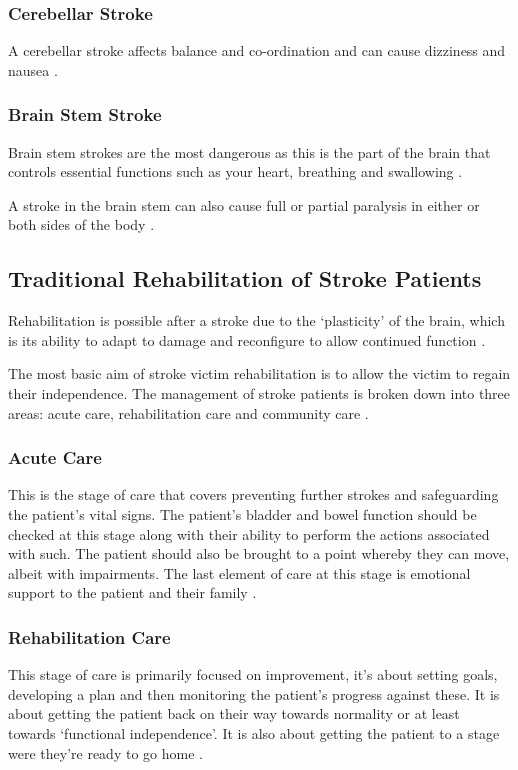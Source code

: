 \documentclass[journal]{IEEEtran}
\begin{document}
\subsubsection{Cerebellar Stroke}
A cerebellar stroke affects balance and co-ordination and can cause dizziness 
and nausea \cite{NSA, TheBrain}.

\subsubsection{Brain Stem Stroke}
Brain stem strokes are the most dangerous as this is the part of the brain that 
controls essential functions such as your heart, breathing and swallowing \cite{NSA,TheBrain}.

A stroke in the brain stem can also cause full or partial paralysis in either or 
both sides of the body \cite{NSA}.

\subsection{Traditional Rehabilitation of Stroke Patients}
Rehabilitation is possible after a stroke due to the `plasticity' of the brain, which is 
its ability to adapt to damage and reconfigure to allow continued function \cite{TheBrain}.

The most basic aim of stroke victim rehabilitation is to allow the victim to regain 
their independence. The management of stroke patients is broken down into three 
areas: acute care, rehabilitation care and community care \cite{Physio}.

\subsubsection{Acute Care}
This is the stage of care that covers preventing further strokes and safeguarding 
the patient's vital signs. The patient's bladder and bowel 
function should be checked at this stage along with their ability to perform the 
actions associated with such. The patient should also be brought to a point 
whereby they can move, albeit with impairments. The last element of care at 
this stage is emotional support to the patient and their family \cite{Physio}.

\subsubsection{Rehabilitation Care}
This stage of care is primarily focused on improvement, it's about setting goals, developing a plan 
and then monitoring the patient's progress against these. It is about getting the patient 
back on their way towards normality or at least towards `functional independence'. It is 
also about getting the patient to a stage were they're ready to go home \cite{Physio}.
\end{document}
